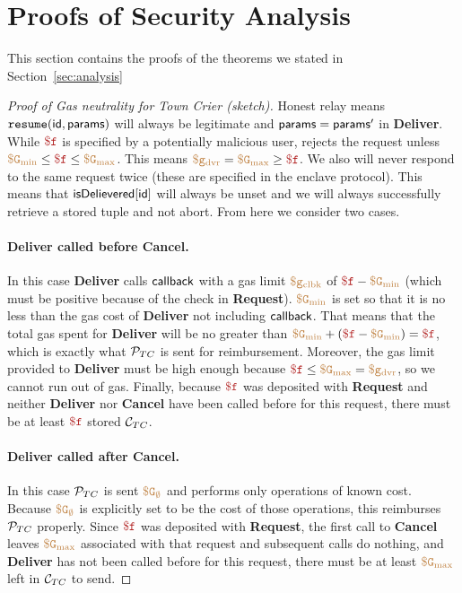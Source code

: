 
\section{Proofs of Security Analysis}
\label{sec:analysis proofs}

This section contains the proofs of the theorems we stated in Section~\ref{sec:analysis}


\begin{proof}[Proof of Gas neutrality for Town Crier (sketch)]
Honest relay means $\texttt{resume}({\sf id}, {\sf params})$ will always be legitimate and ${\sf params} = {\sf params}'$ in {\bf Deliver}.
While $\fee$ is specified by a potentially malicious user, \tcont rejects the request unless $\constgasmin \leq \fee \leq \constgasmax$.
This means $\gasdeliver = \constgasmax \geq \fee$.
We also will never respond to the same request twice (these are specified in the enclave protocol).
This means that ${\sf isDelievered}[{\sf id}]$ will always be unset and we will always successfully retrieve a stored tuple and not abort.
From here we consider two cases.

\paragraph{Deliver called before Cancel.}
In this case {\bf Deliver} calls ${\sf callback}$ with a gas limit $\tt {\color{brown} \$g_\text{clbk} }$ of $\fee - \constgasmin$ (which must be positive because of the check in {\bf Request}).
$\tt {\color{brown} \$G_\text{min} }$ is set so that it is no less than the gas cost of {\bf Deliver} not including ${\sf callback}$.
That means that the total gas spent for {\bf Deliver} will be no greater than $\constgasmin + (\fee - \constgasmin) = \fee$, which is exactly what ${\cal P}_{TC}$ is sent for reimbursement.
Moreover, the gas limit provided to {\bf Deliver} must be high enough because $\fee \leq \constgasmax = \gasdeliver$, so we cannot run out of gas.
Finally, because $\fee$ was deposited with {\bf Request} and neither {\bf Deliver} nor {\bf Cancel} have been called before for this request, there must be at least $\fee$ stored ${\cal C}_{TC}$.

\paragraph{Deliver called after Cancel.}
In this case ${\cal P}_{TC}$ is sent $\tt {\color{brown} \$G_\emptyset }$ and performs only operations of known cost.
Because $\tt {\color{brown} \$G_\emptyset }$ is explicitly set to be the cost of those operations, this reimburses ${\cal P}_{TC}$ properly.
Since $\fee$ was deposited with {\bf Request}, the first call to {\bf Cancel} leaves $\tt {\color{brown} \$G_\text{max} }$ associated with that request and subsequent calls do nothing,
and {\bf Deliver} has not been called before for this request, there must be at least $\tt {\color{brown} \$G_\text{max} }$ left in ${\cal C}_{TC}$ to send.
\end{proof}





